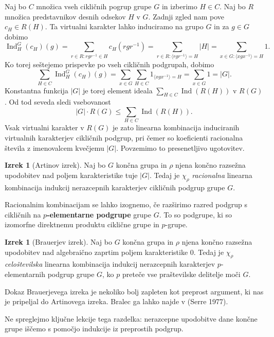 \documentclass[11pt]{book}
\DeclareMathOperator\Ind{Ind}
\def\definicija{\color{rdeca}\bf}
\def\literatura{\color{modra}}
\theoremstyle{definition}
\theoremstyle{zgled}
\theoremstyle{zgledbrezstevilke}
\theoremstyle{odprtproblem}
\theoremstyle{domacanaloga}
\theoremstyle{izrek}
\newtheorem{izrek}[theorem]{Izrek}
\begin{document}
Naj bo $C$ množica vseh cikličnih pogrup grupe $G$ in izberimo $H \in C$. Naj bo $R$ množica predstavnikov desnih odsekov $H$ v $G$. Zadnji zgled nam pove $c_H \in R(H)$. Ta virtualni karakter lahko induciramo na grupo $G$ in za $g \in G$ dobimo
\[
    {\textstyle \Ind^G_H(c_H)(g)} = \sum_{r \in R \colon r g r^{-1} \in H} c_H(r g r^{-1}) =
    \sum_{r \in R \colon \langle r g r^{-1} \rangle = H} |H| =
    \sum_{x \in G \colon  \langle x g x^{-1} \rangle = H} 1.
\]
Ko torej seštejemo prispevke po vseh cikličnih podgrupah, dobimo
\[
  \sum_{H \in C} {\textstyle \Ind^G_H(c_H)(g)} = \sum_{x \in G} \sum_{H \in C} 1_{\langle x g x^{-1} \rangle = H} = \sum_{x \in G} 1 = |G|.  
\]
Konstantna funkcija $|G|$ je torej element ideala $\sum_{H \in C} \Ind(R(H))$ v $R(G)$. Od tod seveda sledi vsebovanost 
\[
    |G| \cdot R(G) \leq \sum_{H \in C} \Ind(R(H)).
\]
Vsak virtualni karakter v $R(G)$ je zato linearna kombinacija induciranih virtualnih karakterjev cikličnih podgrup, pri čemer so koeficienti racionalna števila z imenovalcem kvečjemu $|G|$. Povzemimo to presenetljivo ugotovitev.

\begin{izrek}[Artinov izrek]
Naj bo $G$ končna grupa in $\rho$ njena končno razsežna upodobitev nad poljem karakteristike tuje $|G|$. Tedaj je $\chi_{\rho}$ \emph{racionalna} linearna kombinacija indukcij nerazcepnih karakterjev cikličnih podgrup grupe $G$.
\end{izrek}

Racionalnim kombinacijam se lahko izognemo, če razširimo razred podgrup s cikličnih na {\definicija $p$-elementarne podgrupe} grupe $G$. To so podgrupe, ki so izomorfne direktnemu produktu ciklične grupe in $p$-grupe.

\begin{izrek}[Brauerjev izrek]
Naj bo $G$ končna grupa in $\rho$ njena končno razsežna upodobitev nad algebraično zaprtim poljem karakteristike $0$. Tedaj je $\chi_{\rho}$ \emph{celoštevilska} linearna kombinacija indukcij nerazcepnih karakterjev $p$-elementarnih podgrup grupe $G$, ko $p$ preteče vse praštevilske delitelje moči $G$.
\end{izrek}

Dokaz Brauerjevega izreka je nekoliko bolj zapleten kot preprost argument, ki nas je pripeljal do Artinovega izreka. Bralec ga lahko najde v {\literatura (Serre 1977)}. 

Ne spreglejmo ključne lekcije tega razdelka: nerazcepne upodobitve dane končne grupe iščemo s pomočjo indukcije iz preprostih podgrup.
\end{document}

